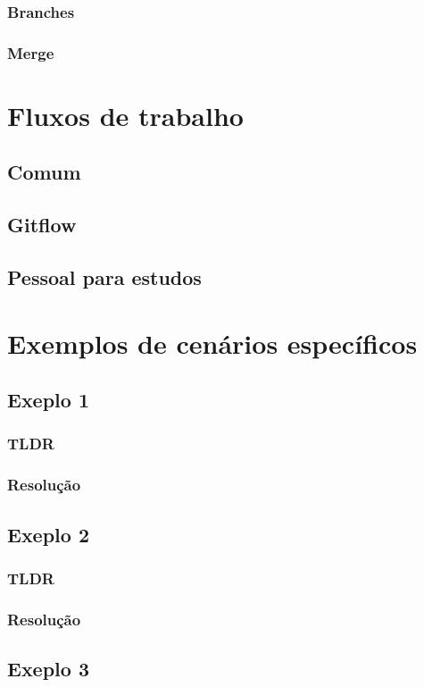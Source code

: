 \documentclass{apostila}
\begin{document}
\subsection{Branches}
\subsection{Merge}


\chapter{Fluxos de trabalho}
\section{Comum}
\section{Gitflow}
\section{Pessoal para estudos}


\chapter{Exemplos de cenários específicos}
\section{Exeplo 1}
\subsection{TLDR}
\subsection{Resolução}
\section{Exeplo 2}
\subsection{TLDR}
\subsection{Resolução}
\section{Exeplo 3}
\end{document}
